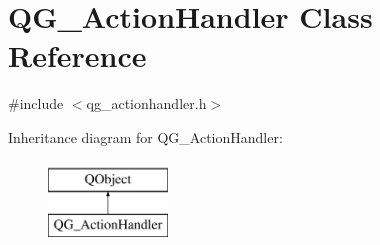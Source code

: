 \hypertarget{classQG__ActionHandler}{\section{Q\-G\-\_\-\-Action\-Handler Class Reference}
\label{classQG__ActionHandler}
}


{\ttfamily \#include $<$qg\-\_\-actionhandler.\-h$>$}

Inheritance diagram for Q\-G\-\_\-\-Action\-Handler\-:\begin{figure}[H]
\begin{center}
\leavevmode
\includegraphics[height=2.000000cm]{classQG__ActionHandler}
\end{center}
\end{figure}
